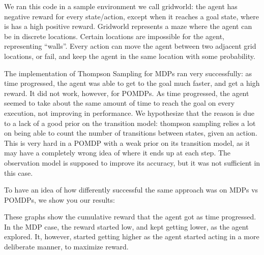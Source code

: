 \documentclass{pset}
\begin{document}
We ran this code in a sample environment we call gridworld: the agent has negative
reward for every state/action, except when it reaches a goal state, where is has
a high positive reward.
Gridworld represents a maze where the agent can be in discrete locations. Certain
locations are impossible for the agent, representing ``walls''. Every action can
move the agent between two adjacent grid locations, or fail, and keep the agent in
the same location with some probability.

The implementation of Thompson Sampling for MDPs ran very successfully: as time
progressed, the agent was able to get to the goal much faster, and get a high
reward. It did not work, however, for POMDPs. As time progressed, the agent seemed
to take about the same amount of time to reach the goal on every execution, not
improving in performance. We hypothesize that the reason is due to a lack of
a good prior on the transition model: thompson sampling relies a lot on being
able to count the number of transitions between states, given an action. This
is very hard in a POMDP with a weak prior on its transition model, as it may have
a completely wrong idea of where it ends up at each step. The observation model
is supposed to improve its accuracy, but it was not sufficient in this case.

To have an idea of how differently successful the same approach was on MDPs vs
POMDPs, we show you our results:


These graphs show the cumulative reward that the agent got as time progressed.
In the MDP case, the reward started low, and kept getting lower, as the agent
explored. It, however, started getting higher as the agent started acting in a
more deliberate manner, to maximize reward.





\end{document}
